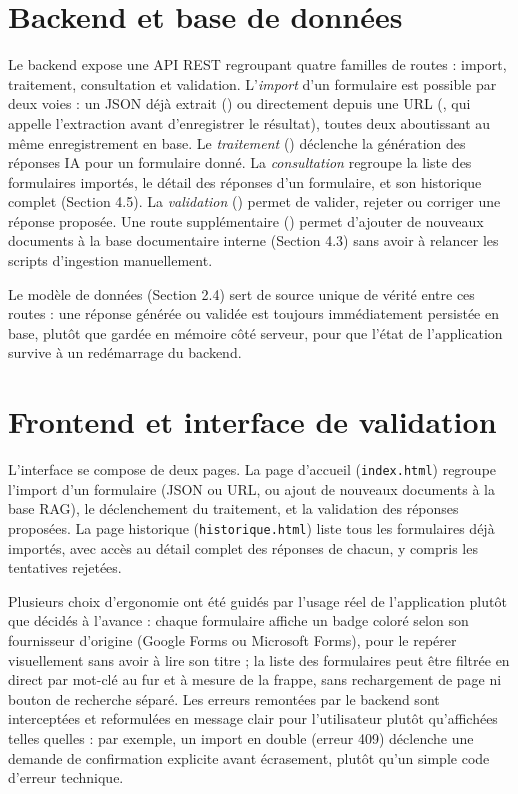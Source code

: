 \documentclass[12pt,a4paper]{report}
\begin{document}
\section{Backend et base de données}

Le backend expose une API REST regroupant quatre familles de routes :
import, traitement, consultation et validation. L'\emph{import}
d'un formulaire est possible par deux voies : un JSON déjà extrait
() ou directement depuis une URL
(, qui appelle l'extraction avant
d'enregistrer le résultat), toutes deux aboutissant au même
enregistrement en base. Le \emph{traitement}
() déclenche la génération
des réponses IA pour un formulaire donné. La \emph{consultation} regroupe
la liste des formulaires importés, le détail des réponses d'un
formulaire, et son historique complet (Section 4.5). La
\emph{validation} () permet de
valider, rejeter ou corriger une réponse proposée. Une route
supplémentaire () permet d'ajouter de nouveaux
documents à la base documentaire interne (Section 4.3) sans avoir à
relancer les scripts d'ingestion manuellement.

Le modèle de données (Section 2.4) sert de source unique de vérité entre
ces routes : une réponse générée ou validée est toujours immédiatement
persistée en base, plutôt que gardée en mémoire côté serveur, pour que
l'état de l'application survive à un redémarrage du backend.

\section{Frontend et interface de validation}

L'interface se compose de deux pages. La page d'accueil
(\texttt{index.html}) regroupe l'import d'un formulaire (JSON ou URL,
ou ajout de nouveaux documents à la base RAG), le déclenchement du
traitement, et la validation des réponses proposées. La page historique
(\texttt{historique.html}) liste tous les formulaires déjà importés,
avec accès au détail complet des réponses de chacun, y compris les
tentatives rejetées.

Plusieurs choix d'ergonomie ont été guidés par l'usage réel de
l'application plutôt que décidés à l'avance : chaque formulaire affiche
un badge coloré selon son fournisseur d'origine (Google Forms ou
Microsoft Forms), pour le repérer visuellement sans avoir à lire son
titre ; la liste des formulaires peut être filtrée en direct par mot-clé
au fur et à mesure de la frappe, sans rechargement de page ni bouton de
recherche séparé. Les erreurs remontées par le backend sont interceptées
et reformulées en message clair pour l'utilisateur plutôt
qu'affichées telles quelles : par exemple, un import en double
(erreur 409) déclenche une demande de confirmation explicite avant
écrasement, plutôt qu'un simple code d'erreur technique.
\end{document}
